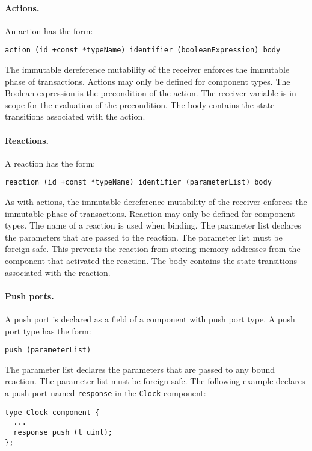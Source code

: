 \paragraph{Actions.}
An action has the form:
\begin{verbatim}
action (id +const *typeName) identifier (booleanExpression) body
\end{verbatim}
The immutable dereference mutability of the receiver enforces the immutable phase of transactions.
Actions may only be defined for component types.
The Boolean expression is the precondition of the action.
The receiver variable is in scope for the evaluation of the precondition.
The body contains the state transitions associated with the action.

\paragraph{Reactions.}
A reaction has the form:
\begin{verbatim}
reaction (id +const *typeName) identifier (parameterList) body
\end{verbatim}
As with actions, the immutable dereference mutability of the receiver enforces the immutable phase of transactions.
Reaction may only be defined for component types.
The name of a reaction is used when binding.
The parameter list declares the parameters that are passed to the reaction.
The parameter list must be foreign safe.
This prevents the reaction from storing memory addresses from the component that activated the reaction.
The body contains the state transitions associated with the reaction.

\paragraph{Push ports.}
A push port is declared as a field of a component with push port type.
A push port type has the form:
\begin{verbatim}
push (parameterList)
\end{verbatim}
The parameter list declares the parameters that are passed to any bound reaction.
The parameter list must be foreign safe.
The following example declares a push port named \verb+response+ in the \verb+Clock+ component:
\begin{verbatim}
type Clock component {
  ...
  response push (t uint);
};
\end{verbatim}

